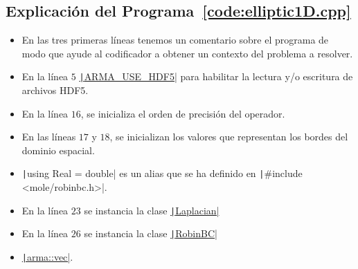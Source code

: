 \begin{problem}

\section*{Explicación del Programa~\ref{code:elliptic1D.cpp}}

\begin{itemize}
    \item

          En las tres primeras líneas tenemos un comentario sobre el
          programa de modo que ayude al codificador a obtener un
          contexto del problema a resolver.

    \item

          En la línea $5$
          \href{https://arma.sourceforge.net/docs.html#config_hpp}{\texttt|ARMA_USE_HDF5|}
          para habilitar la lectura y/o escritura de archivos HDF5.

    \item

          En la línea $16$, se inicializa el orden de precisión del
          operador.

    \item

          En las líneas $17$ y $18$, se inicializan los valores que
          representan los bordes del dominio espacial.

    \item

          \texttt|using Real = double| es un alias que se ha
          definido en \texttt|#include <mole/robinbc.h>|.

    \item

          En la línea $23$ se instancia la clase
          \href{https://carlosal1015.github.io/mole_examples/api_docs/cpp/html/classLaplacian.html}{\texttt|Laplacian|}

    \item

          En la línea $26$ se instancia la clase
          \href{https://carlosal1015.github.io/mole_examples/api_docs/cpp/html/classRobinBC.html}{\texttt|RobinBC|}

    \item

          \href{https://arma.sourceforge.net/docs.html#Col}{\texttt|arma::vec|}.
\end{itemize}
\noQED %
\end{problem}